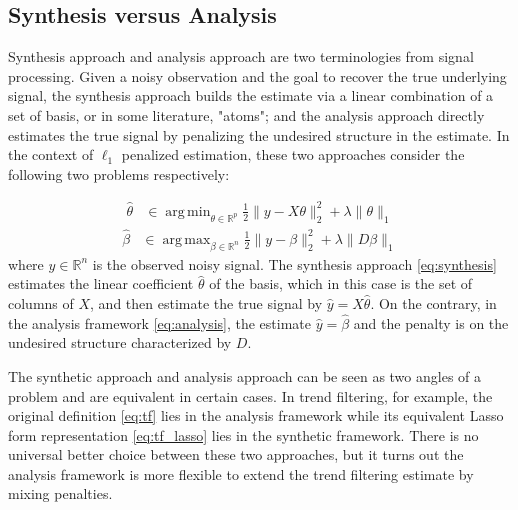 \documentclass[a4paper]{article}
\DeclareMathOperator*{\argmin}{arg\,min}
\DeclareMathOperator*{\argmax}{arg\,max}
\newcommand{\RR}{\mathbb{R}}
\begin{document}
\subsection{Synthesis versus Analysis}
\label{subsec:syn_vs_ana}
Synthesis approach and analysis approach are two terminologies from signal processing. Given a noisy observation and the goal to recover the true underlying signal, the synthesis approach builds the estimate via a linear combination of a set of basis, or in some literature, "atoms"; and the analysis approach directly estimates the true signal by penalizing the undesired structure in the estimate. In the context of $\ell_1$ penalized estimation, these two approaches consider the following two problems respectively:

\begin{align}
\hat{\theta} &\in \argmin_{\theta\in\RR^p}\frac{1}{2}\|y-X\theta\|_2^2 + \lambda\|\theta\|_1
\label{eq:synthesis}
\end{align}
\begin{align}
\hat{\beta} &\in \argmax_{\beta\in\RR^n}\frac{1}{2}\|y-\beta\|_2^2 + \lambda\|D\beta\|_1
\label{eq:analysis}
\end{align}
where $y\in\RR^n$ is the observed noisy signal. The synthesis approach \eqref{eq:synthesis} estimates the linear coefficient $\hat{\theta}$ of the basis, which in this case is the set of columns of $X$, and then estimate the true signal by $\hat{y} = X\hat{\theta}$. On the contrary, in the analysis framework \eqref{eq:analysis}, the estimate $\hat{y} = \hat{\beta}$ and the penalty is on the undesired structure characterized by $D$.

The synthetic approach and analysis approach can be seen as two angles of a problem and are equivalent in certain cases. In trend filtering, for example, the original definition \eqref{eq:tf} lies in the analysis framework while its equivalent Lasso form representation \eqref{eq:tf_lasso} lies in the synthetic framework. There is no universal better choice between these two approaches, but it turns out the analysis framework is more flexible to extend the trend filtering estimate by mixing penalties.
\end{document}

